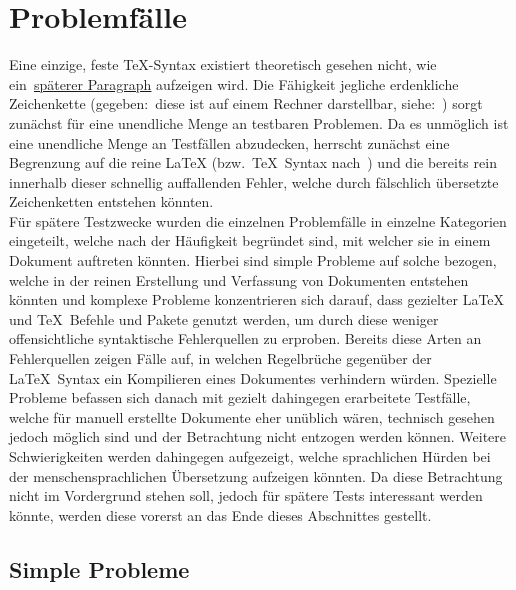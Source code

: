 
\section{Problemfälle}
Eine einzige, feste \TeX{}-Syntax existiert theoretisch gesehen nicht, wie ein~\hyperref[par:catcode]{späterer Paragraph} aufzeigen wird.%
Die Fähigkeit jegliche erdenkliche Zeichenkette (gegeben:\ diese ist auf einem Rechner darstellbar, siehe:~\cite{unicode}) sorgt zunächst für eine unendliche Menge an testbaren Problemen. Da es unmöglich ist eine unendliche Menge an Testfällen abzudecken, herrscht zunächst eine Begrenzung auf die reine \LaTeX{} (bzw.\ \TeX{}~Syntax nach~\cite{texbook}) und die bereits rein innerhalb dieser schnellig auffallenden Fehler, welche durch fälschlich übersetzte Zeichenketten entstehen könnten.\\\noindent
Für spätere Testzwecke wurden die einzelnen Problemfälle in einzelne Kategorien eingeteilt, welche nach der Häufigkeit begründet sind, mit welcher sie in einem Dokument auftreten könnten. Hierbei sind simple Probleme auf solche bezogen, welche in der reinen Erstellung und Verfassung von Dokumenten entstehen könnten und komplexe Probleme konzentrieren sich darauf, dass gezielter \LaTeX{} und \TeX{}~Befehle und Pakete genutzt werden, um durch diese weniger offensichtliche syntaktische Fehlerquellen zu erproben. Bereits diese Arten an Fehlerquellen zeigen Fälle auf, in welchen Regelbrüche gegenüber der \LaTeX{}~Syntax ein Kompilieren eines Dokumentes verhindern würden. Spezielle Probleme befassen sich danach mit gezielt dahingegen erarbeitete Testfälle, welche für manuell erstellte Dokumente eher unüblich wären, technisch gesehen jedoch möglich sind und der Betrachtung nicht entzogen werden können. Weitere Schwierigkeiten werden dahingegen aufgezeigt, welche sprachlichen Hürden bei der menschensprachlichen Übersetzung aufzeigen könnten. Da diese Betrachtung nicht im Vordergrund stehen soll, jedoch für spätere Tests interessant werden könnte, werden diese vorerst an das Ende dieses Abschnittes gestellt.%

\subsection{Simple Probleme}
